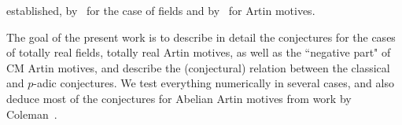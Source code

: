 \documentclass{amsart}
\begin{document}
established, by~\cite{Bar78,Cas-Nog79,Del-Rib} for the case of fields
and by~\cite{greenberg83} for Artin motives. 

The goal of the present work is to describe in detail the conjectures
for the cases of totally real fields, totally real Artin motives, as well as the ``negative part" of CM
Artin motives, and describe the (conjectural) relation between the classical and {$p$-adic{\futurelet{}}} conjectures.
We test everything numerically in several cases, and also deduce most of the conjectures for Abelian Artin
motives from work by Coleman~\cite{Col82}.
\end{document}
